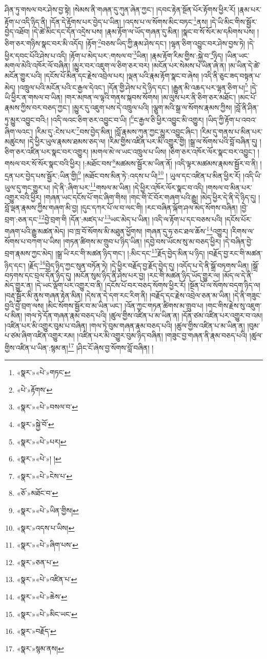 ཤིན་ཏུ་གསལ་བར་ཤེས་བྱ་སྟེ། །སེམས་ནི་གཞན་དུ་ཀུན་ཞེན་ཀྱང་། །དབང་རྟེན་སྔོན་པོར་རྟོགས་ཕྱིར་རོ། །རྣམ་པར་རྟོག་པ་འདི་ཉིད་ནི། །དོན་དེ་རྟོགས་པར་བྱེད་པ་ཡིན། །འདས་པ་ལ་སོགས་མིང་བཏང་\footnote{«སྣར་»«པེ་»གཏང་}ནས། །དེ་ཡི་མིང་གིས་སྦྱོར་བྱེད་འཐོབ། །དེ་ཚེ་མིང་དང་དོན་འདྲེས་པས། །རྣམ་རྟོག་ལ་ཡོད་གཞན་དུ་མིན། །སྣང་བ་སོ་སོར་མ་དམིགས་པས། །ཅིག་ཅར་གཉིས་སྣང་བར་མི་འདོད། །རྟོག་\footnote{«པེ་»རྟོགས་}བཅས་ཡིད་ཀྱི་རྣམ་ཤེས་དང་། །ལྷན་ཅིག་འབྱུང་བར་ཤེས་བྱས་ཏེ། །དེ་ཕྱིར་དབང་པོའི་ཤེས་པ་འདི། །རྟོག་པ་མེད་པར་:གསལ་བ་\footnote{«སྣར་»«པེ་»བསལ་བ་}ཡིན། །རྣམ་རྟོག་རིམ་གྱིས་:སྐྱེ་བ་\footnote{«སྣར་»སྐྱེ་བོ་}ཉིད། །ཡིན་ཡང་མགལ་མེའི་འཁོར་ལོ་བཞིན། །མྱུར་བར་འཇུག་ལ་ཅིག་ཅར་བར། །མངོན་པར་སེམས་པ་ཡིན་ཞེ་ན། །མ་ཡིན་དེ་ཚེ་མངོན་གྱུར་པའི། །དངོས་པོ་མིན་དང་རྗེས་འབྲེལ་པར། །ལྡན་པའི་རྣམ་རྟོག་སྣང་བ་ཞེས། །འདི་ནི་ཅུང་ཟད་བསྟན་པ་མེད། །འཁྲུལ་པའི་མངོན་པའི་ང་རྒྱལ་དེའང་། །དོན་གྱི་ཤེས་པ་དེ་ཉིད་དང་། །རྒྱུན་མི་འཆད་པར་ལྷན་ཅིག་པ།\footnote{«སྣར་»«པེ་»པར།} །དེ་ཡི་ཕྱིར་ན་གསལ་བ་ཡིན། །གར་མཁན་ལ་ལྟའི་གནས་སྐབས་སོགས། །མ་ལུས་པར་ནི་ཅིག་ཅར་མཐོང་། །མང་པོ་རྣམས་ཀྱིས་བར་བཅད་ཀྱང་། །མྱུར་དུ་འཇུག་པས་དེ་འཁྲུལ་པའི། །ལྕུག་མའི་སྒྲ་ལ་སོགས་རྣམས་ཀྱིས། །བློ་ནི་ཤིན་ཏུ་མྱུར་འབྱུང་བའི:། །འདི་ལའང་ཅིག་ཅར་འབྱུང་བ་ཡི། །\footnote{«སྣར་»«པེ་»། །}ང་རྒྱལ་ཅི་ཕྱིར་འབྱུང་མི་འགྱུར། །ཡིད་ཀྱི་རྟོག་པ་འབའ་ཞིག་ལའང་། །རིམ་དུ་:ངེས་པར་\footnote{«སྣར་»«པེ་»ངེས་པ་}བས་བྱེད་མིན། །བློ་རྣམས་ཀུན་ཀྱང་མྱུར་འབྱུང་ཞིང་། །རིམ་དུ་གནས་པ་མིན་པར་མཚུངས། །དེ་ཕྱིར་ཡུལ་རྣམས་ཐམས་ཅད་ལ། །རིམ་གྱིས་འཛིན་པར་མི་འགྱུར་གྱི། །སྒྲ་ལ་སོགས་པའི་བློ་བཞིན་དུ། །ཅིག་ཅར་འཛིན་པར་སྣང་བར་འགྱུར། །མགལ་མེ་ལ་ཡང་འཁྲུལ་པ་ཡིས། །ཅིག་ཅར་འཁོར་ལོར་སྣང་བར་འབྱུང་། །གསལ་བར་སོ་སོར་སྣང་བའི་ཕྱིར། །:མཐོང་བས་\footnote{«ཅོ་»མཐོང་བ་}མཚམས་སྦྱོར་མ་ཡིན་ནོ། །འདི་ལྟར་མཚམས་རྣམས་སྦྱོར་བ་ནི། །དྲན་པར་བྱེད་པས་སྦྱོར་:ཡིན་གྱི།\footnote{«སྣར་»«པེ་»ཡིན་གྱིས།} །མཐོང་བས་མིན་ཏེ་:འདས་པ་ཡི།\footnote{«སྣར་»འདས་པ་ཡིས།} །
ཡུལ་དང་འཛིན་པ་མིན་ཕྱིར་རོ། །འདི་ཡི་ཡུལ་དུ་གང་གྱུར་པ། །དེ་ནི་:ཞིག་པར་\footnote{«སྣར་»«པེ་»ཞིག་པས་}གསལ་མ་ཡིན། །དེ་ཕྱིར་འཁོར་ལོར་སྣང་བ་འདི། །གསལ་བ་མིན་པར་འགྱུར་བའི་ཕྱིར། །གཞན་ཡང་དངོས་པོ་གང་ཞིག་གིས། །གང་གི་ངོ་བོར་གཞག་པའི་རྒྱུ། །མེད་ཕྱིར་དེ་ནི་དེ་ཉིད་དུ། །བློ་ལྡན་རྣམས་ཀྱིས་གཞག་མི་བྱ། །དུང་དཀར་པོ་ལ་བ་ལང་གི། །རང་བཞིན་ལྐོག་ཤལ་མེད་སོགས་བཞིན། །བྱེ་བྲག་:ཅན་དང་\footnote{«སྣར་»ཅན་པ་}བྱེ་བྲག་གི །དོན་:མཛད་པ་\footnote{«སྣར་»«པེ་»འཛིན་པ་}ཡང་མེད་པ་ཡིན། །འདི་ལ་རྟོག་པ་དང་བཅས་པའི། །དངོས་པོར་གཞག་པའི་རྒྱུ་མཚན་མེད། །བ་ཁྲ་བོ་སོགས་མི་མཐུན་ཕྱོགས། །གཞན་དུ་ཧ་ཅང་ཐལ་ཆོས་\footnote{«སྣར་»«པེ་»ཆེས་}འགྱུར། །རིགས་ལ་སོགས་པ་བཀག་པ་ཡིས། །གཏན་ཚིགས་མ་གྲུབ་པ་ཉིད་ཡིན། །དབྱེ་བས་ཡོངས་སུ་མ་བཅད་ཕྱིར། །དེ་བཞིན་བྱེ་བྲག་རྣམས་ཀྱང་མེད། །སྒྲ་ཡི་རང་གི་མཚན་ཉིད་གང་། །:མིང་དང་\footnote{«སྣར་»«པེ་»མིང་ཡང་}རྗོད་བྱེད་མིན་པ་ཉིད། །བརྗོད་བྱ་རང་གི་མཚན་ཉིད་དང་། །རྗོད་\footnote{«སྣར་»བརྗོད་}བྱེད་ཉིད་ཀྱང་སུན་བཏོན་ཏེ། །དེ་ཕྱིར་བརྗོད་བྱ་རྗོད་བྱེད་དུ། །འདོད་པ་དེ་ནི་སྒྲོ་བཏགས་ཡིན། །སྒྲོ་བཏགས་དང་བྲལ་དོན་ཉིད་དུ། །མངོན་སུམ་ཉིད་ནི་ཤེས་པར་བྱ། །རང་གི་མཚན་ཉིད་ཡོད་གྱུར་ལ། །མོད་ལ་དེ་ནི་མེད་གྱུར་ན། །དེ་ཡང་ལྡོག་པར་འགྱུར་བ་ནི། །དངོས་པོ་བར་བཅད་སོགས་ཕྱིར་རོ། །སྔོན་པོ་ལ་སོགས་བདག་ཉིད་ལ། །བརྡ་སྦྱོར་མི་ནུས་གཞན་རྟེན་མིན། །དེས་ན་དེ་དག་རང་རིག་ནི། །བརྗོད་དང་རྗེས་འབྲེལ་ཅན་མ་ཡིན། །དེ་ནི་གཟུང་བྱའི་བྱེ་བྲག་ལས། །མིང་སོགས་སྦྱོར་བ་མ་ཡིན་ཡང་། །འོན་ཀྱང་གཏན་ཚིགས་མ་གྲུབ་པ། །གང་གིས་རྗེས་སུ་འཇུག་པ་མིན། །གལ་ཏེ་དོན་གཞན་རྣམ་བཅད་པའི། །ཚུལ་གྱིས་འཛིན་པ་མ་ཡིན་ན། །དོན་ཙམ་འཛིན་པར་འགྱུར་བ་འམ། །འཛིན་པར་མི་འགྱུར་བུམ་པ་བཞིན། །གལ་ཏེ་བུམ་གཞན་རྣམ་བཅད་པའི། །ཚུལ་གྱིས་འཛིན་པ་མ་ཡིན་ན། །བུམ་པ་ཙམ་ཞིག་འཛིན་འགྱུར་རམ། །འཛིན་པར་མི་འགྱུར་བུམ་ཉིད་བཞིན། །གཟུང་བྱ་གཞན་ནི་རྣམ་བཅད་པའི། །ཚུལ་གྱིས་འཛིན་པ་ཡིན་:སྙམ་ན།\footnote{«སྣར་»སྙམ་ནས།} །ཤིང་ངོ་ཞེས་བྱ་སོགས་བློ་བཞིན། །
